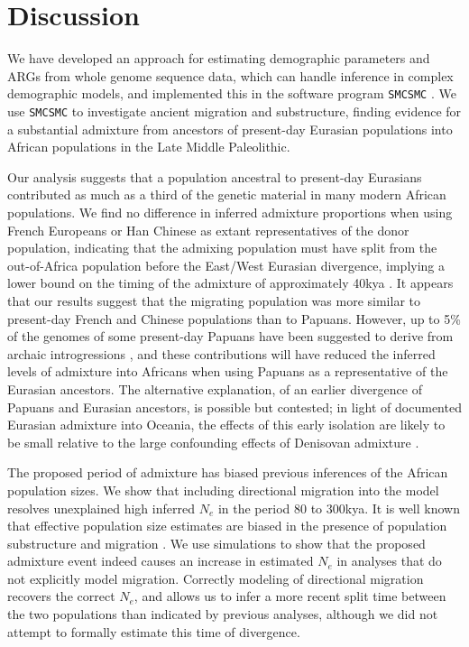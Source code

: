 \documentclass{article}
\begin{document}
\section{Discussion}
We have developed an approach for estimating demographic parameters and ARGs from whole genome sequence data, which can handle inference in complex demographic models, and implemented this in the software program {\tt SMCSMC} \cite{Henderson2018}. We use {\tt SMCSMC} to investigate ancient migration and substructure, finding evidence for a substantial admixture from ancestors of present-day Eurasian populations into African populations in the Late Middle Paleolithic.

Our analysis suggests that a population ancestral to present-day Eurasians contributed as much as a third of the genetic material in many modern African populations. We find no difference in inferred admixture proportions when using French Europeans or Han Chinese as extant representatives of the donor population, indicating that the admixing population must have split from the out-of-Africa population before the East/West Eurasian divergence, implying a lower bound on the timing of the admixture of approximately 40kya \cite{Mathieson2014}. It appears that our results suggest that the migrating population was more similar to present-day French and Chinese populations than to Papuans.  However, up to 5\% of the genomes of some present-day Papuans have been suggested to derive from archaic introgressions \cite{Sankararaman2016}, and these contributions will have reduced the inferred levels of admixture into Africans when using Papuans as a representative of the Eurasian ancestors.
The alternative explanation, of an earlier divergence of Papuans and Eurasian ancestors, is possible but contested; in light of documented Eurasian admixture into Oceania, the effects of this early isolation are likely to be small relative to the large confounding effects of Denisovan admixture \cite{Malaspinas2016, Nielsen2017a}.

The proposed period of admixture has biased previous inferences of the African population sizes. We show that including directional migration into the model resolves unexplained high inferred $N_e$ in the period $80$ to $300$kya. It is well known that effective population size estimates are biased in the presence of population substructure and migration \cite{Chikhi2018, Li2011}. We use simulations to show that the proposed admixture event indeed causes an increase in estimated $N_e$ in analyses that do not explicitly model migration.  Correctly modeling of directional migration recovers the correct $N_e$, and allows us to infer a more recent split time between the two populations than indicated by previous analyses, although we did not attempt to formally estimate this time of divergence.
\end{document}
